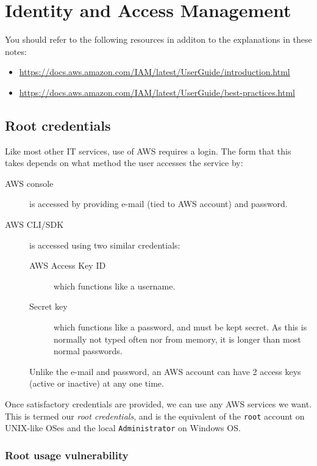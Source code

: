 \chapter{Identity and Access Management}
\label{ch:identity-and-access-management}

You should refer to the following resources in additon to the
explanations in these notes:

\begin{itemize}
\item
  \url{https://docs.aws.amazon.com/IAM/latest/UserGuide/introduction.html}
\item
  \url{https://docs.aws.amazon.com/IAM/latest/UserGuide/best-practices.html}
\end{itemize}

\section{Root credentials}\label{root-credentials}

Like most other IT services, use of AWS requires a login. The form that
this takes depends on what method the user accesses the service by:

\begin{description}
\item[AWS console]
is accessed by providing e-mail (tied to AWS account) and password.
\item[AWS CLI/SDK]
is accessed using two similar credentials:

\begin{description}
\item[AWS Access Key ID]
which functions like a username.
\item[Secret key]
which functions like a password, and must be kept secret. As this is
normally not typed often nor from memory, it is longer than most normal
passwords.
\end{description}

Unlike the e-mail and password, an AWS account can have 2 access keys
(active or inactive) at any one time.
\end{description}

Once satisfactory credentials are provided, we can use any AWS services
we want. This is termed our \emph{root credentials}, and is the
equivalent of the \texttt{root} account on UNIX-like OSes and the local
\texttt{Administrator} on Windows OS.

\subsection{Root usage vulnerability}\label{root-usage-vulnerability}

